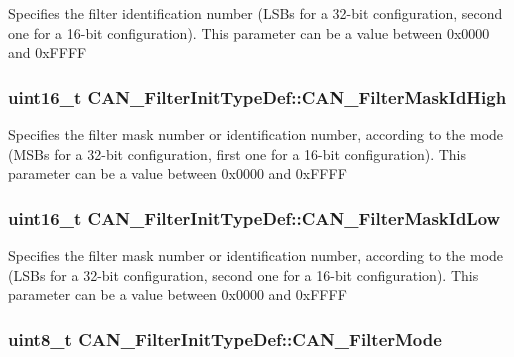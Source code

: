 \label{structCAN__FilterInitTypeDef_ab8c56b48ac323e8c7a1b535c79a51f87}
Specifies the filter identification number (LSBs for a 32-\/bit configuration, second one for a 16-\/bit configuration). This parameter can be a value between 0x0000 and 0xFFFF \hypertarget{structCAN__FilterInitTypeDef_a6f34539615e6484f266b46aa8f362a91}{
\subsubsection[{CAN\_\-FilterMaskIdHigh}]{\setlength{\rightskip}{0pt plus 5cm}uint16\_\-t {\bf CAN\_\-FilterInitTypeDef::CAN\_\-FilterMaskIdHigh}}}
\label{structCAN__FilterInitTypeDef_a6f34539615e6484f266b46aa8f362a91}
Specifies the filter mask number or identification number, according to the mode (MSBs for a 32-\/bit configuration, first one for a 16-\/bit configuration). This parameter can be a value between 0x0000 and 0xFFFF \hypertarget{structCAN__FilterInitTypeDef_a0f052daf04b0a481ecfa5c2cc8058089}{
\subsubsection[{CAN\_\-FilterMaskIdLow}]{\setlength{\rightskip}{0pt plus 5cm}uint16\_\-t {\bf CAN\_\-FilterInitTypeDef::CAN\_\-FilterMaskIdLow}}}
\label{structCAN__FilterInitTypeDef_a0f052daf04b0a481ecfa5c2cc8058089}
Specifies the filter mask number or identification number, according to the mode (LSBs for a 32-\/bit configuration, second one for a 16-\/bit configuration). This parameter can be a value between 0x0000 and 0xFFFF \hypertarget{structCAN__FilterInitTypeDef_a7cfb23c48aad13a058c2619dbc062d8a}{
\subsubsection[{CAN\_\-FilterMode}]{\setlength{\rightskip}{0pt plus 5cm}uint8\_\-t {\bf CAN\_\-FilterInitTypeDef::CAN\_\-FilterMode}}}
\label{structCAN__FilterInitTypeDef_a7cfb23c48aad13a058c2619dbc062d8a}

